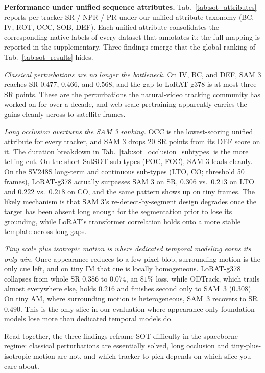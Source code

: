 \documentclass{article}
\newcommand{\subhead}[1]{\noindent\textbf{#1.}}
\newcommand{\minihead}[1]{\noindent\textit{#1.}}
\begin{document}
\subhead{Performance under unified sequence attributes}
\label{sec:exp_sot_attributes}
Tab.~\ref{tab:sot_attributes} reports per-tracker SR / NPR / PR
under our unified attribute taxonomy (BC, IV, ROT, OCC, SOB, DEF).
Each unified attribute consolidates the corresponding native labels
of every dataset that annotates it; the full mapping is reported in
the supplementary. Three findings emerge that the global ranking of
Tab.~\ref{tab:sot_results} hides.

\minihead{Classical perturbations are no longer the
bottleneck}
On IV, BC, and DEF, SAM 3 reaches SR $0.477$, $0.466$, and $0.568$,
and the gap to LoRAT-g378 is at most three SR points. These are the
perturbations the natural-video tracking community has worked on for
over a decade, and web-scale pretraining apparently carries the
gains cleanly across to satellite frames.

\minihead{Long occlusion overturns the SAM 3 ranking}
OCC is the lowest-scoring unified attribute for every tracker, and
SAM 3 drops 20 SR points from its DEF score on it. The duration
breakdown in Tab.~\ref{tab:sot_occlusion_subtypes} is the more
telling cut. On the short SatSOT sub-types (POC, FOC), SAM 3 leads
cleanly. On the SV248S long-term and continuous sub-types (LTO, CO;
threshold 50 frames), LoRAT-g378 actually surpasses SAM 3 on SR,
$0.306$ vs.\ $0.213$ on LTO and $0.222$ vs.\ $0.218$ on CO, and the
same pattern shows up on tiny frames. The likely mechanism is that
SAM 3's re-detect-by-segment design degrades once the target has
been absent long enough for the segmentation prior to lose its
grounding, while LoRAT's transformer correlation holds onto a more
stable template across long gaps.

\minihead{Tiny scale plus isotropic motion is where dedicated
temporal modeling earns its only win}
Once appearance reduces to a few-pixel blob, surrounding motion is
the only cue left, and on tiny IM that cue is locally homogeneous.
LoRAT-g378 collapses from whole SR $0.386$ to $0.074$, an $81\%$
loss, while ODTrack, which trails almost everywhere else, holds
$0.216$ and finishes second only to SAM~3 ($0.308$). On tiny AM,
where surrounding motion is heterogeneous, SAM~3 recovers to SR
$0.490$. This is the only slice in our evaluation where
appearance-only foundation models lose more than dedicated temporal
models do.

Read together, the three findings reframe SOT difficulty in the
spaceborne regime: classical perturbations are essentially solved,
long occlusion and tiny-plus-isotropic motion are not, and which
tracker to pick depends on which slice you care about.
\end{document}
